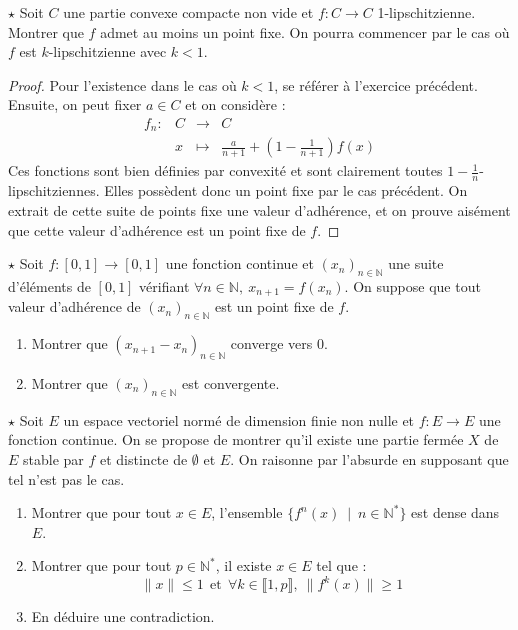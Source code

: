 \documentclass[french,a4paper]{article}
\newcommand{\N}{\mathbb{N}}
\newcommand{\st}{^*}
\theoremstyle{plain}
\theoremstyle{definition}
\theoremstyle{remark}
\begin{document}
\begin{ex}[Moulin.28]{$\star$}
	Soit $C$ une partie convexe compacte non vide et $f:C\to C$ 1-lipschitzienne. Montrer que $f$ admet au moins un point fixe. On pourra commencer par le cas où $f$ est $k$-lipschitzienne avec $k<1$.
\end{ex}
\begin{proof}
	Pour l'existence dans le cas où $k<1$, se référer à l'exercice précédent. Ensuite, on peut fixer $a\in C$ et on considère : $$\begin{array}{lrcl}
		f_n:&C&\longrightarrow&C\\
		&x&\longmapsto &\displaystyle\frac{a}{n+1}+\left(1-\frac{1}{n+1}\right)f(x)
	\end{array}$$ Ces fonctions sont bien définies par convexité et sont clairement toutes $\displaystyle 1-\frac{1}{n}$-lipschitziennes. Elles possèdent donc un point fixe par le cas précédent. On extrait de cette suite de points fixe une valeur d'adhérence, et on prouve aisément que cette valeur d'adhérence est un point fixe de $f$.
\end{proof}

\begin{ex}[Moulin.29]{$\star$}
	Soit $f:[0,1]\to[0,1]$ une fonction continue et $(x_n)_{n\in\N}$ une suite d'éléments de $[0,1]$ vérifiant $\forall n\in\N,\ x_{n+1}=f(x_n)$. On suppose que tout valeur d'adhérence de $(x_n)_{n\in\N}$ est un point fixe de $f$.
	\begin{enumerate}
		\item Montrer que $(x_{n+1}-x_n)_{n\in\N}$ converge vers $0$.
		\item Montrer que $(x_n)_{n\in\N}$ est convergente.
	\end{enumerate}
\end{ex}

\begin{ex}[Moulin.30]{$\star$}
	Soit $E$ un espace vectoriel normé de dimension finie non nulle et $f:E\to E$ une fonction continue. On se propose de montrer qu'il existe une partie fermée $X$ de $E$ stable par $f$ et distincte de $\emptyset$ et $E$. On raisonne par l'absurde en supposant que tel n'est pas le cas.
	\begin{enumerate}
		\item Montrer que pour tout $x\in E$, l'ensemble $\{f^n(x)\ \mid \ n\in\N\st\}$ est dense dans $E$.
		\item Montrer que pour tout $p\in\N\st$, il existe $x\in E$ tel que : $$\lVert x\rVert\leqslant 1\ \ \text{et}\ \ \forall k\in\llbracket1,p\rrbracket,\ \lVert f^k(x)\rVert\geqslant 1$$
		\item En déduire une contradiction.
	\end{enumerate}
\end{ex}
\end{document}
